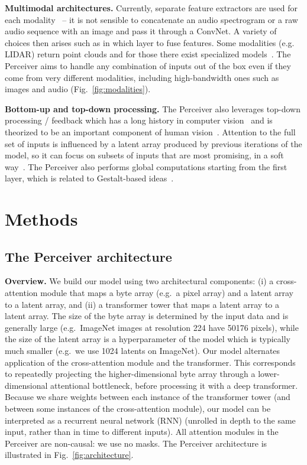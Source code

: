 \documentclass{article}
\begin{document}
\noindent \textbf{Multimodal architectures.}
Currently, separate feature extractors are used for each modality~\cite{kaiser2017one,arandjelovic2018objects,wang2020makes,chen2019uniter,alayrac2020self,lee2020making,xiao2020audiovisual} -- it is not sensible to concatenate an audio spectrogram or a raw audio sequence with an image and pass it through a  ConvNet. A variety of choices then arises such as in which layer to fuse features. Some modalities (e.g. LIDAR) return point clouds and for those there exist specialized models~\cite{qi2017pointnet++,guo2020pct}. The Perceiver aims to handle any combination of inputs out of the box even if they come from very different modalities, including high-bandwidth ones such as images and audio (Fig.~\ref{fig:modalities}).

\noindent \textbf{Bottom-up and top-down processing.} The Perceiver also leverages top-down processing / feedback which has a long history in computer vision~\cite{borenstein2004combining,kumar2005obj,carreira2016human,hu2016bottom} and is theorized to be an important component of human vision~\cite{olshausen1993neurobiological}. Attention to the full set of inputs is influenced by a latent array produced by previous iterations of the model, so it can focus on subsets of inputs that are most promising, in a soft way~\cite{zoran2020towards}. The Perceiver also performs global computations starting from the first layer, which is related to Gestalt-based ideas~\cite{kohler1967gestalt,shi2000normalized}.

\section{Methods}
\label{sec:methods}

\subsection{The Perceiver architecture}

\noindent \textbf{Overview.} We build our model using two architectural components: (i) a cross-attention module that maps a byte array (e.g.\ a pixel array) and a latent array to a latent array, and (ii) a transformer tower that maps a latent array to a latent array. The size of the byte array is determined by the input data and is generally large (e.g.\ ImageNet images at resolution 224 have 50176 pixels), while the size of the latent array is a hyperparameter of the model which is typically much smaller (e.g.\ we use 1024 latents on ImageNet). Our model alternates application of the cross-attention module and the transformer. This corresponds to repeatedly projecting the higher-dimensional byte array through a lower-dimensional attentional bottleneck, before processing it with a deep transformer. Because we share weights between each instance of the transformer tower (and between some instances of the cross-attention module), our model can be interpreted as a recurrent neural network (RNN) (unrolled in depth to the same input, rather than in time to different inputs). All attention modules in the Perceiver are non-causal: we use no masks. The Perceiver architecture is illustrated in Fig.~\ref{fig:architecture}.
\end{document}
